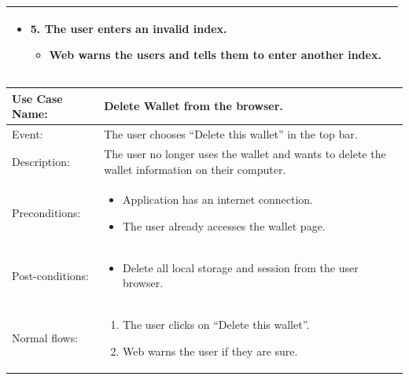 \begin{table}[]
\begin{tabular}{m{4cm} m{11cm} }
\begin{itemize}
            \item {5. The user enters an invalid index.}
                  \begin{itemize}
                      \item Web warns the users and tells them to enter another index.
                  \end{itemize}
        \end{itemize}                                                \\ 
        \bottomrule
    \end{tabular}
\end{table}
\clearpage

\begin{table}[]
    \begin{tabular}{m{4cm} m{11cm}}
        \toprule
        Use Case Name:     & Delete Wallet from the browser.                                                                  \\ 
        \midrule 
        Event:             & The user chooses “Delete this wallet” in the top bar.                                            \\ 
        \midrule 
        Description:       & The user no longer uses the wallet and wants to delete the wallet information on their computer. \\ 
        \midrule 
        Preconditions:     & \begin{itemize}
            \item Application has an internet connection.
            \item The user already accesses the wallet page.
        \end{itemize}                                                                       \\ 
        \midrule 
        Post-conditions:   & \begin{itemize}
            \item Delete all local storage and session from the user browser.
        \end{itemize}                                                                       \\ 
        \midrule 
        Normal flows:      & \begin{enumerate}
            \item The user clicks on “Delete this wallet”.
            \item Web warns the user if they are sure.

\end{enumerate}
\end{tabular}
\end{table}
